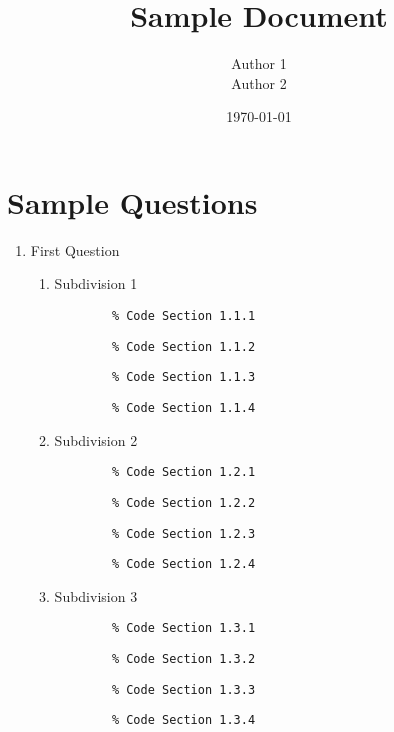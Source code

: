 \documentclass{article}
\title{Sample Document}
\author{Author 1 \\ Author 2}
\date{\today}
\begin{document}
\maketitle

\section*{Sample Questions}

\begin{enumerate}
    \item First Question
    \begin{enumerate}[label*=\arabic*.]
        \item Subdivision 1
        \begin{verbatim}
        % Code Section 1.1.1
        \end{verbatim}
        \begin{verbatim}
        % Code Section 1.1.2
        \end{verbatim}
        \begin{verbatim}
        % Code Section 1.1.3
        \end{verbatim}
        \begin{verbatim}
        % Code Section 1.1.4
        \end{verbatim}
        
        \item Subdivision 2
        \begin{verbatim}
        % Code Section 1.2.1
        \end{verbatim}
        \begin{verbatim}
        % Code Section 1.2.2
        \end{verbatim}
        \begin{verbatim}
        % Code Section 1.2.3
        \end{verbatim}
        \begin{verbatim}
        % Code Section 1.2.4
        \end{verbatim}

        \item Subdivision 3
        \begin{verbatim}
        % Code Section 1.3.1
        \end{verbatim}
        \begin{verbatim}
        % Code Section 1.3.2
        \end{verbatim}
        \begin{verbatim}
        % Code Section 1.3.3
        \end{verbatim}
        \begin{verbatim}
        % Code Section 1.3.4
        \end{verbatim}


\end{enumerate}
\end{enumerate}
\end{document}
